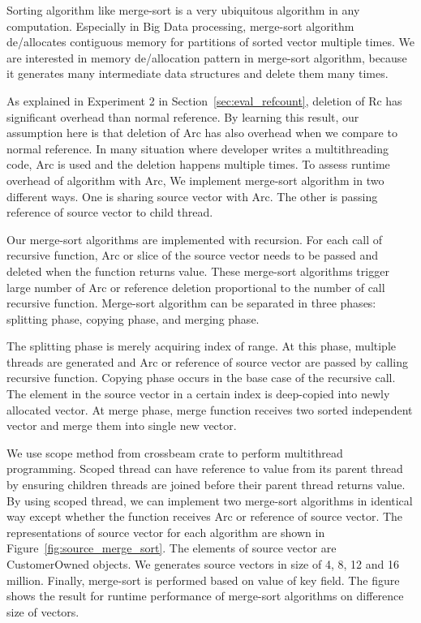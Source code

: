 Sorting algorithm like merge-sort is a very ubiquitous algorithm in any computation. 
Especially in Big Data processing, merge-sort algorithm de/allocates contiguous memory for partitions of sorted vector multiple times.
We are interested in memory de/allocation pattern in merge-sort algorithm, because it generates many intermediate data structures and delete them many times.

As explained in Experiment 2 in Section~\ref{sec:eval_refcount}, deletion of Rc has significant overhead than normal reference. 
By learning this result, our assumption here is that deletion of Arc has also overhead when we compare to normal reference. 
In many situation where developer writes a multithreading code, Arc is used and the deletion happens multiple times. 
To assess runtime overhead of algorithm with Arc, We implement merge-sort algorithm in two different ways. 
One is sharing source vector with Arc. The other is passing reference of source vector to child thread. 

Our merge-sort algorithms are implemented with recursion. For each call of recursive function, 
Arc or slice of the source vector needs to be passed and deleted when the function returns value. 
These merge-sort algorithms trigger large number of Arc or reference deletion proportional to the number of call recursive function.
Merge-sort algorithm can be separated in three phases: splitting phase, copying phase, and merging phase. 

The splitting phase is merely acquiring index of range. At this phase, multiple threads are generated and Arc or reference of source vector are passed by calling recursive function. 
Copying phase occurs in the base case of the recursive call. The element in the source vector in a certain index is deep-copied into newly allocated vector.
At merge phase, merge function receives two sorted independent vector and merge them into single new vector.

We use scope method from crossbeam crate to perform multithread programming. 
Scoped thread can have reference to value from its parent thread by ensuring children threads are joined before their parent thread returns value. 
By using scoped thread, we can implement two merge-sort algorithms in identical way except whether the function receives Arc or reference of source vector.
The representations of source vector for each algorithm are shown in Figure~\ref{fig:source_merge_sort}.
The elements of source vector are CustomerOwned objects. We generates source vectors in size of 4, 8, 12 and 16 million.
Finally, merge-sort is performed based on value of key field. The figure shows the result for runtime performance of merge-sort algorithms on difference size of vectors. 

